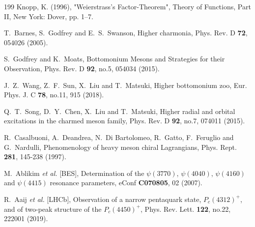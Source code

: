 \documentclass[final,5p,times,twocolumn]{elsarticle}
\begin{document}
\begin{thebibliography}{199}
Knopp, K. (1996), "Weierstrass's Factor-Theorem", Theory of Functions, Part II, New York: Dover, pp. 1–7.


T.~Barnes, S.~Godfrey and E.~S.~Swanson,
Higher charmonia,
Phys. Rev. D \textbf{72}, 054026 (2005).


S.~Godfrey and K.~Moats,
Bottomonium Mesons and Strategies for their Observation,
Phys. Rev. D \textbf{92}, no.5, 054034 (2015).


J.~Z.~Wang, Z.~F.~Sun, X.~Liu and T.~Matsuki,
Higher bottomonium zoo,
Eur. Phys. J. C \textbf{78}, no.11, 915 (2018).


Q.~T.~Song, D.~Y.~Chen, X.~Liu and T.~Matsuki,
Higher radial and orbital excitations in the charmed meson family,
Phys. Rev. D \textbf{92}, no.7, 074011 (2015).


R.~Casalbuoni, A.~Deandrea, N.~Di Bartolomeo, R.~Gatto, F.~Feruglio and G.~Nardulli,
Phenomenology of heavy meson chiral Lagrangians,
Phys. Rept. \textbf{281}, 145-238 (1997).


M.~Ablikim \textit{et al.} [BES],
Determination of the $\psi(3770)$, $\psi(4040)$, $\psi(4160)$ and $\psi(4415)$ resonance parameters,
eConf \textbf{C070805}, 02 (2007).



R.~Aaij \textit{et al.} [LHCb],
Observation of a narrow pentaquark state, $P_c(4312)^+$, and of two-peak structure of the $P_c(4450)^+$,
Phys. Rev. Lett. \textbf{122}, no.22, 222001 (2019).



\end{thebibliography}
\end{document}
